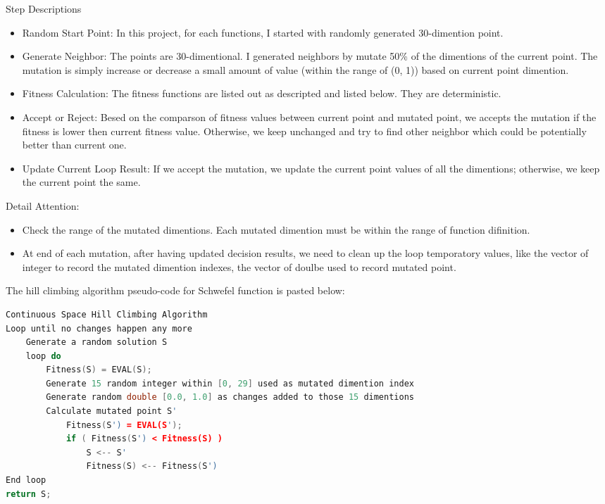 \documentclass{article}
\begin{document}
\begin{CJK}{UTF8}{gbsn}
\begin{description}
\item Step Descriptions
  \begin{itemize}
    \itemsep=-3pt
  \item Random Start Point: In this project, for each functions, I started with randomly generated 30-dimention point. 
  \item Generate Neighbor: The points are 30-dimentional. I generated neighbors by mutate 50\% of the dimentions of the current point. The mutation is simply increase or decrease a small amount of value (within the range of (0, 1)) based on current point dimention. 
  \item Fitness Calculation: The fitness functions are listed out as descripted and listed below. They are deterministic. 
  \item Accept or Reject: Besed on the comparson of fitness values between current point and mutated point, we accepts the mutation if the fitness is lower then current fitness value. Otherwise, we keep unchanged and try to find other neighbor which could be potentially better than current one. 
  \item Update Current Loop Result: If we accept the mutation, we update the current point values of all the dimentions; otherwise, we keep the current point the same.
  \end{itemize}

\item Detail Attention: 
  \begin{itemize}
    \itemsep=-3pt
  \item Check the range of the mutated dimentions. Each mutated dimention must be within the range of function difinition. 
  \item At end of each mutation, after having updated decision results, we need to clean up the loop temporatory values, like the vector of integer to record the mutated dimention indexes, the vector of doulbe used to record mutated point. 
  \end{itemize}
\end{description}

The hill climbing algorithm pseudo-code for Schwefel function is pasted below: 
\begin{lstlisting}[language=c++]
Continuous Space Hill Climbing Algorithm
Loop until no changes happen any more
    Generate a random solution S
    loop do
        Fitness(S) = EVAL(S);
        Generate 15 random integer within [0, 29] used as mutated dimention index
        Generate random double [0.0, 1.0] as changes added to those 15 dimentions
        Calculate mutated point S'
            Fitness(S') = EVAL(S');
            if ( Fitness(S') < Fitness(S) )
                S <-- S'
                Fitness(S) <-- Fitness(S')
End loop
return S;
\end{lstlisting}
\begin{lstlisting}[language=c++]
\end{lstlisting}


\end{CJK}
\end{document}
